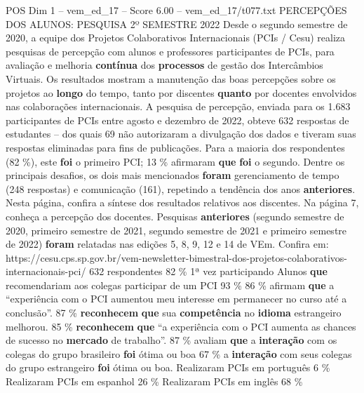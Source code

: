 \begin{textsample}{POS Dim 1 – vem\_ed\_17 – Score 6.00 – vem\_ed\_17/t077.txt}  \label{ex:f1_pos_135}
PERCEPÇÕES DOS ALUNOS: PESQUISA 2º SEMESTRE 2022 Desde o segundo semestre de 2020, a equipe dos Projetos Colaborativos Internacionais (PCIs / Cesu) realiza pesquisas de percepção com alunos e professores participantes de PCIs, para avaliação e melhoria \textbf{contínua} dos \textbf{processos} de gestão dos Intercâmbios Virtuais.
Os resultados mostram a manutenção das boas percepções sobre os projetos ao \textbf{longo} do tempo, tanto por discentes \textbf{quanto} por docentes envolvidos nas colaborações internacionais.
A pesquisa de percepção, enviada para os 1.683 participantes de PCIs entre agosto e dezembro de 2022, obteve 632 respostas de estudantes – dos quais 69 não autorizaram a divulgação dos dados e tiveram suas respostas eliminadas para fins de publicações.
Para a maioria dos respondentes (82 \%), este \textbf{foi} o primeiro PCI; 13 \% afirmaram \textbf{que} \textbf{foi} o segundo.
Dentre os principais desafios, os dois mais mencionados \textbf{foram} gerenciamento de tempo (248 respostas) e comunicação (161), repetindo a tendência dos anos \textbf{anteriores}.
Nesta página, confira a síntese dos resultados relativos aos discentes.
Na página 7, conheça a percepção dos docentes.
Pesquisas \textbf{anteriores} (segundo semestre de 2020, primeiro semestre de 2021, segundo semestre de 2021 e primeiro semestre de 2022) \textbf{foram} relatadas nas edições 5, 8, 9, 12 e 14 de VEm.
Confira em: https://cesu.cps.sp.gov.br/vem-newsletter-bimestral-dos-projetos-colaborativos-internacionais-pci/ 632 respondentes 82 \% 1ª vez participando Alunos \textbf{que} recomendariam aos colegas participar de um PCI 93 \% 86 \% afirmam \textbf{que} a “experiência com o PCI aumentou meu interesse em permanecer no curso até a conclusão”. 87 \% \textbf{reconhecem} \textbf{que} sua \textbf{competência} no \textbf{idioma} estrangeiro melhorou. 85 \% \textbf{reconhecem} \textbf{que} “a experiência com o PCI aumenta as chances de sucesso no \textbf{mercado} de trabalho”. 87 \% avaliam \textbf{que} a \textbf{interação} com os colegas do grupo brasileiro \textbf{foi} ótima ou boa 67 \% a \textbf{interação} com seus colegas do grupo estrangeiro \textbf{foi} ótima ou boa.
Realizaram PCIs em português 6 \% Realizaram PCIs em espanhol 26 \% Realizaram PCIs em inglês 68 \%

\end{textsample}
